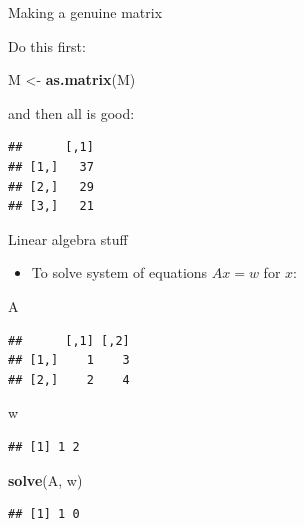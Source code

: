 \documentclass[
  ignorenonframetext,
]{beamer}
\newenvironment{Shaded}{\begin{snugshade}}{\end{snugshade}}
\newcommand{\KeywordTok}[1]{\textcolor[rgb]{0.13,0.29,0.53}{\textbf{#1}}}
\newcommand{\NormalTok}[1]{#1}
\newcommand{\OperatorTok}[1]{\textcolor[rgb]{0.81,0.36,0.00}{\textbf{#1}}}
\newcommand{\StringTok}[1]{\textcolor[rgb]{0.31,0.60,0.02}{#1}}
\providecommand{\tightlist}{%
  \setlength{\itemsep}{0pt}\setlength{\parskip}{0pt}}
\begin{document}
\begin{frame}[fragile]{Making a genuine matrix}
\protect\hypertarget{making-a-genuine-matrix}{}

Do this first:

\begin{Shaded}
\begin{Highlighting}[]
\NormalTok{M <-}\StringTok{ }\KeywordTok{as.matrix}\NormalTok{(M)}
\end{Highlighting}
\end{Shaded}

and then all is good:

\begin{Shaded}
\end{Shaded}

\begin{verbatim}
##      [,1]
## [1,]   37
## [2,]   29
## [3,]   21
\end{verbatim}

\end{frame}

\begin{frame}[fragile]{Linear algebra stuff}
\protect\hypertarget{linear-algebra-stuff}{}

\begin{itemize}
\tightlist
\item
  To solve system of equations \(Ax = w\) for \(x\):
\end{itemize}

\begin{Shaded}
\begin{Highlighting}[]
\NormalTok{A}
\end{Highlighting}
\end{Shaded}

\begin{verbatim}
##      [,1] [,2]
## [1,]    1    3
## [2,]    2    4
\end{verbatim}

\begin{Shaded}
\begin{Highlighting}[]
\NormalTok{w}
\end{Highlighting}
\end{Shaded}

\begin{verbatim}
## [1] 1 2
\end{verbatim}

\begin{Shaded}
\begin{Highlighting}[]
\KeywordTok{solve}\NormalTok{(A, w)}
\end{Highlighting}
\end{Shaded}

\begin{verbatim}
## [1] 1 0
\end{verbatim}

\end{frame}
\end{document}
